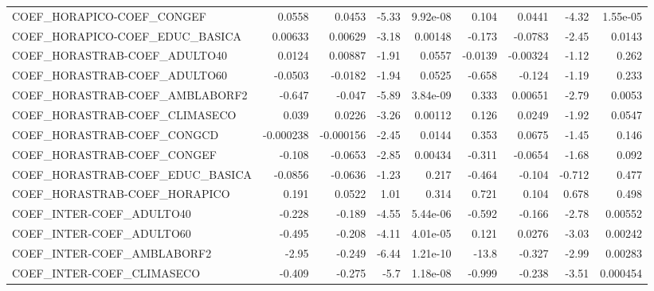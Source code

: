 \begin{tabular}{lrrrrrrrr}
COEF\_HORAPICO-COEF\_CONGEF             &      0.0558 &       0.0453 &    -5.33 & 9.92e-08 &      0.104 &      0.0441 &        -4.32 &      1.55e-05 \\
COEF\_HORAPICO-COEF\_EDUC\_BASICA        &     0.00633 &      0.00629 &    -3.18 &  0.00148 &     -0.173 &     -0.0783 &        -2.45 &        0.0143 \\
COEF\_HORASTRAB-COEF\_ADULTO40          &      0.0124 &      0.00887 &    -1.91 &   0.0557 &    -0.0139 &    -0.00324 &        -1.12 &         0.262 \\
COEF\_HORASTRAB-COEF\_ADULTO60          &     -0.0503 &      -0.0182 &    -1.94 &   0.0525 &     -0.658 &      -0.124 &        -1.19 &         0.233 \\
COEF\_HORASTRAB-COEF\_AMBLABORF2        &      -0.647 &       -0.047 &    -5.89 & 3.84e-09 &      0.333 &     0.00651 &        -2.79 &        0.0053 \\
COEF\_HORASTRAB-COEF\_CLIMASECO         &       0.039 &       0.0226 &    -3.26 &  0.00112 &      0.126 &      0.0249 &        -1.92 &        0.0547 \\
COEF\_HORASTRAB-COEF\_CONGCD            &   -0.000238 &    -0.000156 &    -2.45 &   0.0144 &      0.353 &      0.0675 &        -1.45 &         0.146 \\
COEF\_HORASTRAB-COEF\_CONGEF            &      -0.108 &      -0.0653 &    -2.85 &  0.00434 &     -0.311 &     -0.0654 &        -1.68 &         0.092 \\
COEF\_HORASTRAB-COEF\_EDUC\_BASICA       &     -0.0856 &      -0.0636 &    -1.23 &    0.217 &     -0.464 &      -0.104 &       -0.712 &         0.477 \\
COEF\_HORASTRAB-COEF\_HORAPICO          &       0.191 &       0.0522 &     1.01 &    0.314 &      0.721 &       0.104 &        0.678 &         0.498 \\
COEF\_INTER-COEF\_ADULTO40              &      -0.228 &       -0.189 &    -4.55 & 5.44e-06 &     -0.592 &      -0.166 &        -2.78 &       0.00552 \\
COEF\_INTER-COEF\_ADULTO60              &      -0.495 &       -0.208 &    -4.11 & 4.01e-05 &      0.121 &      0.0276 &        -3.03 &       0.00242 \\
COEF\_INTER-COEF\_AMBLABORF2            &       -2.95 &       -0.249 &    -6.44 & 1.21e-10 &      -13.8 &      -0.327 &        -2.99 &       0.00283 \\
COEF\_INTER-COEF\_CLIMASECO             &      -0.409 &       -0.275 &     -5.7 & 1.18e-08 &     -0.999 &      -0.238 &        -3.51 &      0.000454 \\

\end{tabular}
